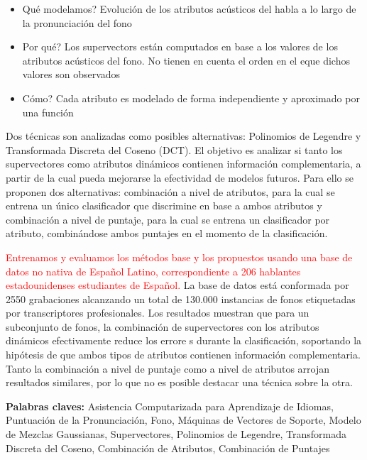 \begin{itemize}
  \item Qué modelamos? Evolución de los atributos acústicos del habla a lo largo de la pronunciación del fono
  \item Por qué? Los supervectors están computados en base a los valores de los atributos
  acústicos del fono. No tienen en cuenta el orden en el eque dichos valores son observados
  \item Cómo? Cada atributo es modelado de forma independiente y aproximado por una función
\end{itemize}

Dos técnicas son analizadas como posibles alternativas:
Polinomios de Legendre y Transformada Discreta del Coseno (DCT).
El objetivo
es analizar si tanto los supervectores como atributos dinámicos
contienen información complementaria,
a partir de la cual pueda mejorarse la efectividad de modelos futuros.
Para ello
se proponen dos alternativas: combinación a nivel de atributos,
para la cual se entrena un único clasificador que discrimine en base a ambos atributos
y combinación a nivel de puntaje,
para la cual se entrena un clasificador por atributo, combinándose ambos puntajes
en el momento de la clasificación.


\textcolor{red}{
Entrenamos y evaluamos los métodos base y los propuestos usando una base de datos no nativa
de Español Latino, correspondiente a 206 hablantes estadounidenses estudiantes de Español.}
La base de datos está conformada por 2550 grabaciones alcanzando
un total de 130.000 instancias de fonos etiquetadas
por transcriptores profesionales.
Los resultados muestran que para un subconjunto de fonos, la combinación de supervectores
con los atributos dinámicos efectivamente reduce los errore s durante la clasificación,
soportando la
hipótesis de que ambos tipos de atributos contienen información complementaria.
Tanto la combinación a nivel de puntaje como a nivel de atributos
arrojan resultados similares, por
lo que no es posible destacar una técnica sobre la otra.

\bigskip

\noindent\textbf{Palabras claves:} Asistencia Computarizada para Aprendizaje de Idiomas, Puntuación de la Pronunciación, Fono, Máquinas de Vectores de Soporte, Modelo de Mezclas Gaussianas, Supervectores, Polinomios de Legendre, Transformada Discreta del Coseno, Combinación de Atributos, Combinación de Puntajes

